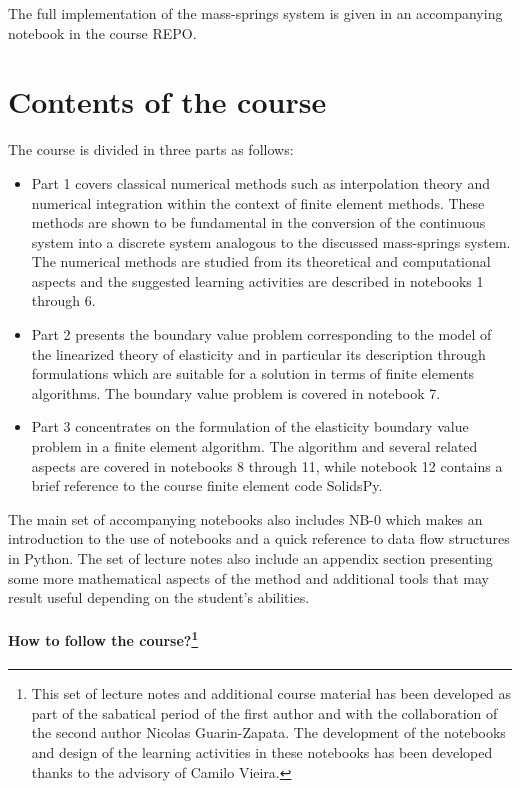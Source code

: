 The full implementation of the mass-springs system is given in an accompanying notebook in the course REPO.
\newpage
\section*{Contents of the course}
The course is divided in three parts as follows:

\begin{itemize}
\item Part 1 covers classical numerical methods such as interpolation theory and numerical integration within the context of finite element methods. These methods are shown to be fundamental in the conversion of the continuous system into a discrete system analogous to the discussed mass-springs system. The numerical methods are studied from its theoretical and computational aspects and the suggested learning activities are described in notebooks 1 through 6.

\item Part 2 presents the boundary value problem corresponding to the model of the linearized theory of elasticity and in particular its description through formulations which are suitable for a solution in terms of finite elements algorithms. The boundary value problem is covered in notebook 7.

\item Part 3 concentrates on the formulation of the elasticity boundary value 
problem in a finite element algorithm. The algorithm and several related 
aspects are covered in notebooks 8 through 11, while notebook 12 contains a 
brief reference to the course finite element code SolidsPy.
\end{itemize}

The main set of accompanying notebooks also includes NB-0 which makes an introduction to the use of notebooks and a quick reference to data flow structures in Python. The set of lecture notes also include an appendix section presenting some more mathematical aspects of the method and additional tools that may result useful depending on the student's abilities.


\paragraph*{How to follow the course?\footnote{This set of lecture notes and 
additional course material has been developed as part of the sabatical period 
of the first author and with the collaboration of the second author Nicolas 
Guarin-Zapata. The development of the notebooks and design of the learning 
activities in these notebooks has been developed thanks to the advisory of 
Camilo Vieira.}}

